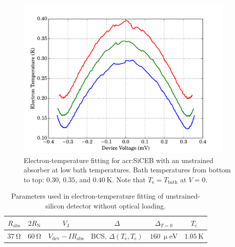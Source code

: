 \begin{figure}[tb]
\begin{center}
\includegraphics[width = 0.95\textwidth]{figures/control_Te}
\caption[Electron-temperature fitting for \gls{acr:SiCEB} with an unstrained absorber]{Electron-temperature fitting for \gls{acr:SiCEB} with an unstrained absorber at low bath temperatures. Bath temperatures from bottom to top: $0.30$, $0.35$, and $0.40~\mathrm{K}$. Note that $T_{\mathrm{e}} = T_{\mathrm{bath}}$ at $V = 0$.}
\label{fig:controlTe}
\end{center}
\end{figure}
\begin{table}[htb]
\caption[Parameters used in electron-temperature fitting of unstrained-silicon detector with optical loading]{Parameters used in electron-temperature fitting of unstrained-silicon detector without optical loading.} 
\label{tab:ControlTeParams_dark}
\centering
\begin{tabular}{cccccc}
\toprule\toprule
$R_{\mathrm{abs}}$ & $2R_{\mathrm{N}}$ & $V_{\mathrm{J}}$ & $\varDelta$ & $\varDelta_{T=0}$ & $T_{\mathrm{c}}$ \\ \midrule
$37~\mathrm{\Omega}$ & $60~\mathrm{\Omega}$ & $V_{\mathrm{dev}} - IR_{\mathrm{abs}}$ 
& BCS, $\varDelta\left(T_{\mathrm{e}},T_{\mathrm{c}}\right)$ & $160~\mathrm{\upmu eV}$ & $1.05~\mathrm{K}$ \\
\bottomrule
\end{tabular}
\end{table}
%
